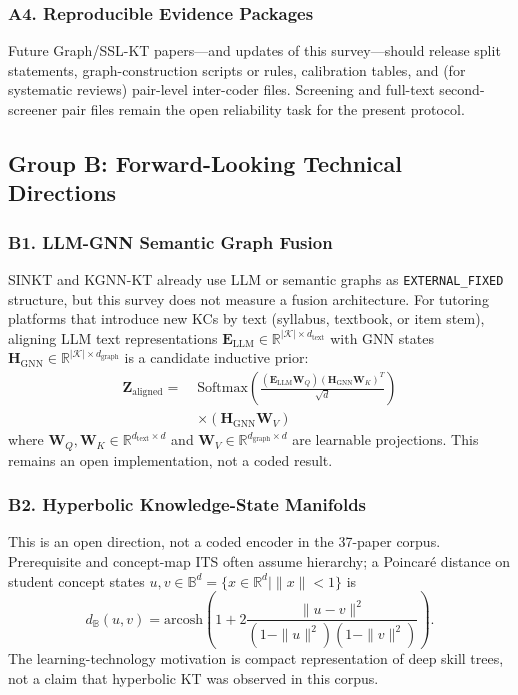 \documentclass[lettersize,journal]{IEEEtran}
\begin{document}
\subsubsection{A4. Reproducible Evidence Packages}
Future Graph/SSL-KT papers---and updates of this survey---should release split statements, graph-construction scripts or rules, calibration tables, and (for systematic reviews) pair-level inter-coder files. Screening and full-text second-screener pair files remain the open reliability task for the present protocol.

\subsection{Group B: Forward-Looking Technical Directions}

\subsubsection{B1. LLM-GNN Semantic Graph Fusion}
SINKT and KGNN-KT already use LLM or semantic graphs as \texttt{EXTERNAL\_FIXED} structure, but this survey does not measure a fusion architecture. For tutoring platforms that introduce new KCs by text (syllabus, textbook, or item stem), aligning LLM text representations $\mathbf{E}_{\text{LLM}} \in \mathbb{R}^{|\mathcal{K}| \times d_{\text{text}}}$ with GNN states $\mathbf{H}_{\text{GNN}} \in \mathbb{R}^{|\mathcal{K}| \times d_{\text{graph}}}$ is a candidate inductive prior:
\begin{equation}
\begin{split}
\mathbf{Z}_{\text{aligned}} = \; & \text{Softmax}\left(\frac{(\mathbf{E}_{\text{LLM}}\mathbf{W}_Q)(\mathbf{H}_{\text{GNN}}\mathbf{W}_K)^T}{\sqrt{d}}\right) \\
& \times (\mathbf{H}_{\text{GNN}}\mathbf{W}_V)
\end{split}
\end{equation}
where $\mathbf{W}_Q, \mathbf{W}_K \in \mathbb{R}^{d_{\text{text}} \times d}$ and $\mathbf{W}_V \in \mathbb{R}^{d_{\text{graph}} \times d}$ are learnable projections. This remains an open implementation, not a coded result.

\subsubsection{B2. Hyperbolic Knowledge-State Manifolds}
This is an open direction, not a coded encoder in the 37-paper corpus. Prerequisite and concept-map ITS often assume hierarchy; a Poincaré distance on student concept states $u, v \in \mathbb{B}^d = \{x \in \mathbb{R}^d \mid \|x\| < 1\}$ is
\begin{equation}
d_{\mathbb{B}}(u, v) = \text{arcosh}\left(1 + 2 \frac{\|u - v\|^2}{(1 - \|u\|^2)(1 - \|v\|^2)}\right).
\end{equation}
The learning-technology motivation is compact representation of deep skill trees, not a claim that hyperbolic KT was observed in this corpus.
\end{document}
